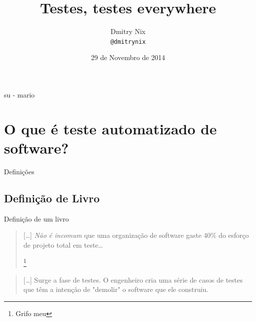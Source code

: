 \documentclass[]{beamer}
\author[Dmitry]{Dmitry Nix \\ \texttt{@dmitrynix}}
\title{Testes, testes everywhere}
\institute{ /(guru|pug-)pi/i }
\date{29 de Novembro de 2014}
\begin{document}
  \begin{frame}
    \titlepage
  \end{frame}

  \begin{frame}{su - mario}
    \tableofcontents
  \end{frame}

  \section{O que é teste automatizado de software?}

  \begin{frame}
    \begin{center}
      \Huge Definições
    \end{center}
  \end{frame}


  \subsection*{Definição de Livro}\label{def1}
  \begin{frame}
    \begin{center}
      \Huge Definição de um livro
    \end{center}
  \end{frame}

  \begin{frame}{\subsecname}
    \blockquote[{\cite[Pressman]{pressman_engenharia_1995}}]{
      [\ldots] \emph{Não é incomum} que uma organização de software gaste 40\%
      do esforço de projeto total em teste\ldots

      \let\thefootnote\relax\footnote{Grifo meu}
    }
  \end{frame}

  \begin{frame}{\subsecname}
    \blockquote[{\cite[Pressman]{pressman_engenharia_1995}}]{
      [\ldots] Surge a fase de testes. O engenheiro cria uma série de casos de testes
      que têm a intenção de "demolir" o software que ele construiu.
    }
  \end{frame}
\end{document}
